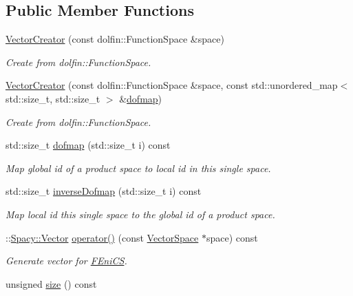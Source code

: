 \subsection*{Public Member Functions}
\begin{DoxyCompactItemize}
\item 
\hyperlink{classSpacy_1_1FEniCS_1_1VectorCreator_aadd31cbf47db5a102001cd97f0a844bc}{Vector\+Creator} (const dolfin\+::\+Function\+Space \&space)
\begin{DoxyCompactList}\small\item\em Create from dolfin\+::\+Function\+Space. \end{DoxyCompactList}\item 
\hyperlink{classSpacy_1_1FEniCS_1_1VectorCreator_a4140fedb928d0fa1bdf5e449b2dc964a}{Vector\+Creator} (const dolfin\+::\+Function\+Space \&space, const std\+::unordered\+\_\+map$<$ std\+::size\+\_\+t, std\+::size\+\_\+t $>$ \&\hyperlink{classSpacy_1_1FEniCS_1_1VectorCreator_ad41a34e44494e8d166f9890a8877f994}{dofmap})
\begin{DoxyCompactList}\small\item\em Create from dolfin\+::\+Function\+Space. \end{DoxyCompactList}\item 
std\+::size\+\_\+t \hyperlink{classSpacy_1_1FEniCS_1_1VectorCreator_ad41a34e44494e8d166f9890a8877f994}{dofmap} (std\+::size\+\_\+t i) const 
\begin{DoxyCompactList}\small\item\em Map global id of a product space to local id in this single space. \end{DoxyCompactList}\item 
std\+::size\+\_\+t \hyperlink{classSpacy_1_1FEniCS_1_1VectorCreator_a8e369dcbb722462ee0bca008eae6b2f3}{inverse\+Dofmap} (std\+::size\+\_\+t i) const 
\begin{DoxyCompactList}\small\item\em Map local id this single space to the global id of a product space. \end{DoxyCompactList}\item 
\+::\hyperlink{classSpacy_1_1Vector}{Spacy\+::\+Vector} \hyperlink{classSpacy_1_1FEniCS_1_1VectorCreator_ab5121de05ec984b99febef9e839068dc}{operator()} (const \hyperlink{classSpacy_1_1VectorSpace}{Vector\+Space} $\ast$space) const 
\begin{DoxyCompactList}\small\item\em Generate vector for \hyperlink{namespaceSpacy_1_1FEniCS}{F\+Eni\+C\+S}. \end{DoxyCompactList}\item 
\hypertarget{classSpacy_1_1FEniCS_1_1VectorCreator_afb8357f953730e792e18e8bc16a585b4}{}unsigned \hyperlink{classSpacy_1_1FEniCS_1_1VectorCreator_afb8357f953730e792e18e8bc16a585b4}{size} () const \label{classSpacy_1_1FEniCS_1_1VectorCreator_afb8357f953730e792e18e8bc16a585b4}


\end{DoxyCompactItemize}
